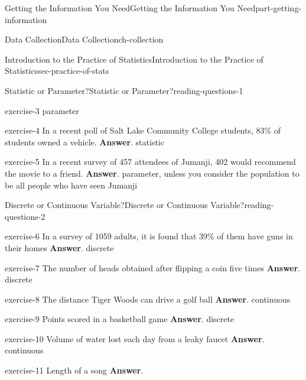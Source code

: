 \documentclass[oneside,10pt,]{book}
\numberwithin{equation}{section}
\begin{document}
\begin{partptx}{Getting the Information You Need}{}{Getting the Information You Need}{}{}{part-getting-information}
\begin{chapterptx}{Data Collection}{}{Data Collection}{}{}{ch-collection}
\begin{sectionptx}{Introduction to the Practice of Statistics}{}{Introduction to the Practice of Statistics}{}{}{sec-practice-of-stats}
\begin{reading-questions-subsection-numberless}{Statistic or Parameter?}{}{Statistic or Parameter?}{}{}{reading-questions-1}
\begin{divisionexercise}{3}{}{}{exercise-3}
parameter\end{divisionexercise}%
\begin{divisionexercise}{4}{}{}{exercise-4}%
In a recent poll of Salt Lake Community College students, 83\% of students owned a vehicle. \textbf{Answer}.\hypertarget{answer-4}{}\quad%
statistic\end{divisionexercise}%
\begin{divisionexercise}{5}{}{}{exercise-5}%
In a recent survey of 457 attendees of Jumanji, 402 would recommend the movie to a friend. \textbf{Answer}.\hypertarget{answer-5}{}\quad%
parameter, unless you consider the population to be all people who have seen Jumanji\end{divisionexercise}%
\end{reading-questions-subsection-numberless}
%
%
\typeout{************************************************}
\typeout{************************************************}
%
\begin{reading-questions-subsection-numberless}{Discrete or Continuous Variable?}{}{Discrete or Continuous Variable?}{}{}{reading-questions-2}
\begin{divisionexercise}{1}{}{}{exercise-6}%
In a survey of 1059 adults, it is found that 39\% of them have guns in their homes \textbf{Answer}.\hypertarget{answer-6}{}\quad%
discrete\end{divisionexercise}%
\begin{divisionexercise}{2}{}{}{exercise-7}%
The number of heads obtained after flipping a coin five times \textbf{Answer}.\hypertarget{answer-7}{}\quad%
discrete\end{divisionexercise}%
\begin{divisionexercise}{3}{}{}{exercise-8}%
The distance Tiger Woods can drive a golf ball \textbf{Answer}.\hypertarget{answer-8}{}\quad%
continuous\end{divisionexercise}%
\begin{divisionexercise}{4}{}{}{exercise-9}%
Points scored in a basketball game \textbf{Answer}.\hypertarget{answer-9}{}\quad%
discrete\end{divisionexercise}%
\begin{divisionexercise}{5}{}{}{exercise-10}%
Volume of water lost each day from a leaky faucet \textbf{Answer}.\hypertarget{answer-10}{}\quad%
continuous\end{divisionexercise}%
\begin{divisionexercise}{6}{}{}{exercise-11}%
Length of a song \textbf{Answer}.\hypertarget{answer-11}{}\quad%

\end{divisionexercise}
\end{reading-questions-subsection-numberless}
\end{sectionptx}
\end{chapterptx}
\end{partptx}
\end{document}
